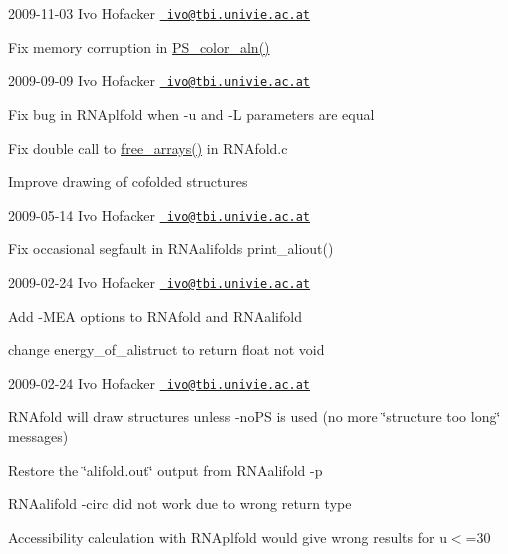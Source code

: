 2009-\/11-\/03 Ivo Hofacker \href{mailto:ivo@tbi.univie.ac.at}{\texttt{ ivo@tbi.\+univie.\+ac.\+at}}


\begin{DoxyItemize}
\item Fix memory corruption in \mbox{\hyperlink{group__plotting__utils__deprecated_ga821802c3685e37e15182341f6217470d}{P\+S\+\_\+color\+\_\+aln()}}
\end{DoxyItemize}

2009-\/09-\/09 Ivo Hofacker \href{mailto:ivo@tbi.univie.ac.at}{\texttt{ ivo@tbi.\+univie.\+ac.\+at}}


\begin{DoxyItemize}
\item Fix bug in R\+N\+Aplfold when -\/u and -\/L parameters are equal
\item Fix double call to \mbox{\hyperlink{group__mfe__global__deprecated_ga107fdfe5fd641868156bfd849f6866c7}{free\+\_\+arrays()}} in R\+N\+Afold.\+c
\item Improve drawing of cofolded structures
\end{DoxyItemize}

2009-\/05-\/14 Ivo Hofacker \href{mailto:ivo@tbi.univie.ac.at}{\texttt{ ivo@tbi.\+univie.\+ac.\+at}}


\begin{DoxyItemize}
\item Fix occasional segfault in R\+N\+Aalifold\textquotesingle{}s print\+\_\+aliout()
\end{DoxyItemize}

2009-\/02-\/24 Ivo Hofacker \href{mailto:ivo@tbi.univie.ac.at}{\texttt{ ivo@tbi.\+univie.\+ac.\+at}}


\begin{DoxyItemize}
\item Add -\/M\+EA options to R\+N\+Afold and R\+N\+Aalifold
\item change energy\+\_\+of\+\_\+alistruct to return float not void
\end{DoxyItemize}

2009-\/02-\/24 Ivo Hofacker \href{mailto:ivo@tbi.univie.ac.at}{\texttt{ ivo@tbi.\+univie.\+ac.\+at}}


\begin{DoxyItemize}
\item R\+N\+Afold will draw structures unless -\/no\+PS is used (no more \char`\"{}structure too long\char`\"{} messages)
\item Restore the \char`\"{}alifold.\+out\char`\"{} output from R\+N\+Aalifold -\/p
\item R\+N\+Aalifold -\/circ did not work due to wrong return type
\item Accessibility calculation with R\+N\+Aplfold would give wrong results for u$<$=30
\end{DoxyItemize}

